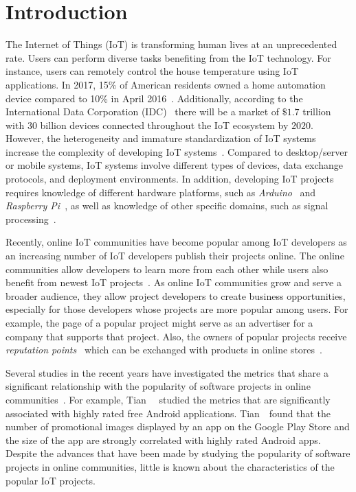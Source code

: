 \section{Introduction}\label{introduction}
\begin{comment}
\end{comment}

The Internet of Things (IoT) is transforming human lives at an unprecedented
rate. Users can perform diverse tasks benefiting from the IoT technology. For
instance, users can remotely control the house temperature using IoT
applications. In 2017, 15\% of American residents owned a home automation
device compared to 10\% in April 2016~\cite{npd}. Additionally, according to the
International Data Corporation (IDC)~\cite{idc} there will be a market of
$\$1.7$ trillion with $30$ billion devices connected throughout the IoT
ecosystem by $2020$.  However, the heterogeneity and immature standardization
of IoT systems increase the complexity of developing IoT
systems~\cite{li2015internet,botta2014integration}. Compared to desktop/server
or mobile systems, IoT systems involve different types of devices, data
exchange protocols, and deployment environments. In addition, developing IoT
projects requires knowledge of different hardware platforms, such as
\textit{Arduino}~\cite{arduino} and \textit{Raspberry Pi}~\cite{raspberrypi},
as well as knowledge of other specific domains, such as signal
processing~\cite{chattopadhyay2015way}. 

Recently, online IoT communities have become popular among IoT developers as an
increasing number of IoT developers publish their projects online. The online
communities allow developers to learn more from each other while users also
benefit from newest IoT projects~\cite{singh2017create}. As online IoT
communities grow and serve a broader audience, they allow project developers to
create business opportunities, especially for those developers whose projects
are more popular among users. For example, the page of a popular project might
serve as an advertiser for a company that supports that project.
Also, the owners of popular projects receive {\em reputation
points}~\cite{reputation} which can be exchanged with products in online stores~\cite{store}.

Several studies in the recent years have investigated the metrics that share a
significant relationship with the popularity of software projects in online
communities~\cite{chen2011predicting, tian2015characteristics,
krutz2016examining, stewart2002exploratory}.  For example,
Tian~\etal~\cite{tian2015characteristics} studied the metrics that are
significantly associated with highly rated free Android applications.
Tian~\etal~found that the number of promotional images displayed by an app on
the Google Play Store and the size of the app are strongly correlated with
highly rated Android apps. Despite the advances that have been made by studying the popularity of software
projects in online communities, little is known about the characteristics of
the popular IoT projects.

